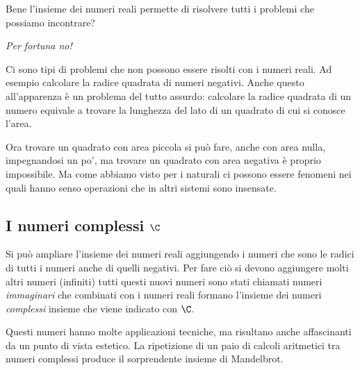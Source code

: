 Bene l'insieme dei numeri reali permette di risolvere tutti i problemi che 
possiamo incontrare? 

\begin{center} \emph{Per fortuna no!} \end{center} 

Ci sono tipi di problemi che non possono essere risolti con i numeri reali.
Ad esempio calcolare la radice quadrata di numeri negativi. 
Anche questo all'apparenza è un problema del tutto assurdo: calcolare la 
radice quadrata di un numero equivale a trovare la lunghezza del lato di un 
quadrato di cui si conosce l'area. 

Ora trovare un quadrato con area piccola si può fare, anche con 
area nulla, impegnandosi un po', ma trovare un quadrato con area negativa 
è proprio impossibile. 
Ma come abbiamo visto per i naturali ci possono essere fenomeni nei quali 
hanno senso operazioni che in altri sistemi sono insensate.

\subsection{I numeri complessi $\C$}
\label{subsec:insnum_complessi}

Si può ampliare l'insieme dei numeri reali aggiungendo i numeri che sono le 
radici di tutti i numeri anche di quelli negativi. Per fare ciò si devono 
aggiungere molti altri numeri (infiniti) tutti questi nuovi numeri sono 
stati 
chiamati numeri \emph{immaginari} che combinati con i numeri reali formano 
l'insieme dei numeri \emph{complessi} insieme che viene indicato con $\C$.

Questi numeri hanno molte applicazioni tecniche, ma risultano anche 
affascinanti da un punto di vista estetico. La ripetizione di un paio di 
calcoli aritmetici tra numeri complessi produce il sorprendente insieme di 
Mandelbrot.

